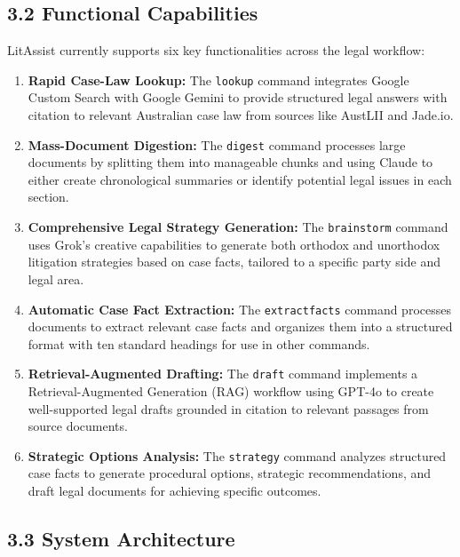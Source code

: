 \documentclass[12pt,a4paper]{article}
\begin{document}
\subsection*{3.2 Functional Capabilities}

LitAssist currently supports six key functionalities across the legal workflow:

\begin{enumerate}

\item \textbf{Rapid Case-Law Lookup:} The \texttt{lookup} command integrates Google Custom Search with Google Gemini to provide structured legal answers with citation to relevant Australian case law from sources like AustLII and Jade.io.

\item \textbf{Mass-Document Digestion:} The \texttt{digest} command processes large documents by splitting them into manageable chunks and using Claude to either create chronological summaries or identify potential legal issues in each section.

\item \textbf{Comprehensive Legal Strategy Generation:} The \texttt{brainstorm} command uses Grok's creative capabilities to generate both orthodox and unorthodox litigation strategies based on case facts, tailored to a specific party side and legal area.

\item \textbf{Automatic Case Fact Extraction:} The \texttt{extractfacts} command processes documents to extract relevant case facts and organizes them into a structured format with ten standard headings for use in other commands.

\item \textbf{Retrieval-Augmented Drafting:} The \texttt{draft} command implements a Retrieval-Augmented Generation (RAG) workflow using GPT-4o to create well-supported legal drafts grounded in citation to relevant passages from source documents.

\item \textbf{Strategic Options Analysis:} The \texttt{strategy} command analyzes structured case facts to generate procedural options, strategic recommendations, and draft legal documents for achieving specific outcomes.

\end{enumerate}

\subsection*{3.3 System Architecture}
\end{document}
